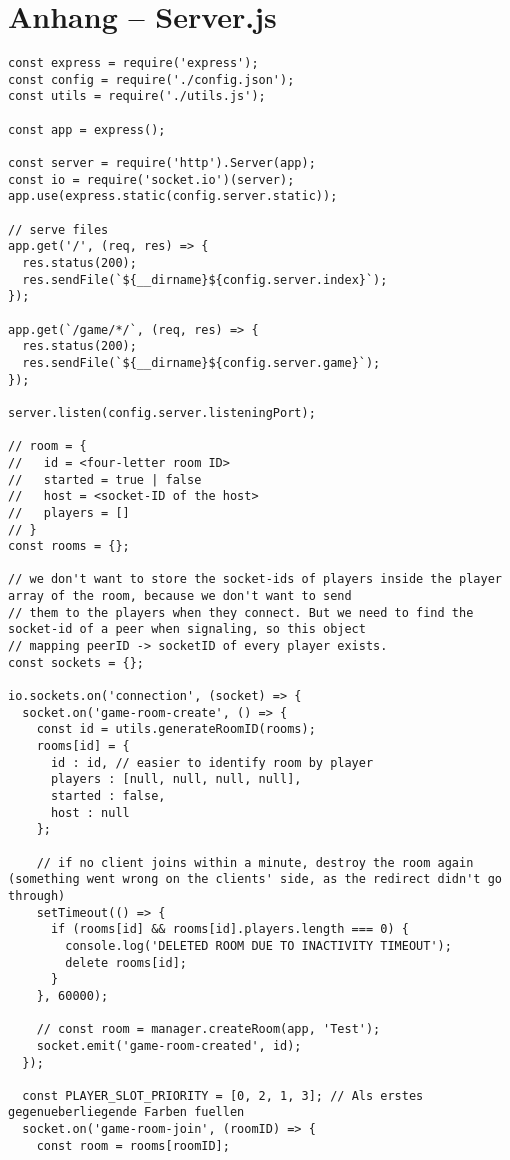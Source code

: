 \chapter{Anhang -- Server.js}
\lstset{language=js, style=STYLE_CODE_JS}
\begin{singlespace}
\begin{lstlisting}[]
const express = require('express');
const config = require('./config.json');
const utils = require('./utils.js');

const app = express();

const server = require('http').Server(app);
const io = require('socket.io')(server);
app.use(express.static(config.server.static));

// serve files
app.get('/', (req, res) => {
  res.status(200);
  res.sendFile(`${__dirname}${config.server.index}`);
});

app.get(`/game/*/`, (req, res) => {
  res.status(200);
  res.sendFile(`${__dirname}${config.server.game}`);
});

server.listen(config.server.listeningPort);

// room = {
//   id = <four-letter room ID>
//   started = true | false
//   host = <socket-ID of the host>
//   players = []
// }
const rooms = {};

// we don't want to store the socket-ids of players inside the player array of the room, because we don't want to send
// them to the players when they connect. But we need to find the socket-id of a peer when signaling, so this object
// mapping peerID -> socketID of every player exists.
const sockets = {};

io.sockets.on('connection', (socket) => {
  socket.on('game-room-create', () => {
    const id = utils.generateRoomID(rooms);
    rooms[id] = {
      id : id, // easier to identify room by player
      players : [null, null, null, null],
      started : false,
      host : null
    };

    // if no client joins within a minute, destroy the room again (something went wrong on the clients' side, as the redirect didn't go through)
    setTimeout(() => {
      if (rooms[id] && rooms[id].players.length === 0) {
        console.log('DELETED ROOM DUE TO INACTIVITY TIMEOUT');
        delete rooms[id];
      }
    }, 60000);

    // const room = manager.createRoom(app, 'Test');
    socket.emit('game-room-created', id);
  });

  const PLAYER_SLOT_PRIORITY = [0, 2, 1, 3]; // Als erstes gegenueberliegende Farben fuellen
  socket.on('game-room-join', (roomID) => {
    const room = rooms[roomID];


\end{lstlisting}
\end{singlespace}
